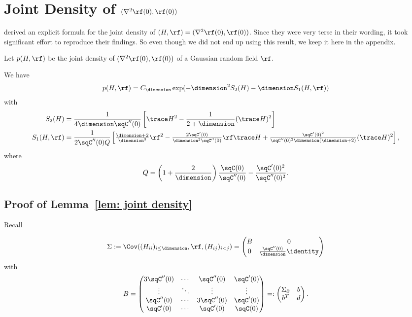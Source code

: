 \section{Joint Density of \texorpdfstring{\((\nabla^2\rf(0), \rf(0))\)}{(hessian ϕ(0), ϕ(0))}}

\textcite{brayStatisticsCriticalPoints2007} derived an explicit formula for the
joint density of \((H,\rf)=(\nabla^2\rf(0), \rf(0))\). Since they were very
terse in their wording, it took significant effort to reproduce their findings.
So even though we did not end up using this result, we keep it here in the
appendix.

Let \(p(H, \rf)\) be the joint density of \((\nabla^2\rf(0), \rf(0))\) of
a Gaussian random field \(\rf\).

\begin{lemma}\label{lem: joint density}
	We have
	\[
		p(H, \rf) = C_\dimension \exp(-\dimension^2 S_2(H) - \dimension S_1(H, \rf))
	\]
	with
	\begin{align*}
		S_2(H)
		&= \frac{1}{4\dimension\sqC''(0)}\left[
			\trace H^2 - \frac1{2+\dimension}(\trace H)^2
		\right]
		\\
		S_1(H,\rf)
		&= \frac1{2\sqC''(0)Q}\left[
			\tfrac{\dimension+2}{\dimension^3}\rf^2
			- \tfrac{2\sqC'(0)}{\dimension^2\sqC''(0)}\rf\trace H
			+ \tfrac{\sqC'(0)^2}{\sqC''(0)^2\dimension(\dimension+2)}(\trace H)^2
		\right],
	\end{align*}
	where
	\[
		Q = \left(1+\frac2\dimension\right)
		\frac{\sqC(0)}{\sqC''(0)} - \frac{\sqC'(0)^2}{\sqC''(0)^2}.
	\]
\end{lemma}

\subsection{Proof of Lemma~\ref{lem: joint density}}\label{subsec: joint density derivation}

Recall

\[
	\Sigma := \Cov((H_{ii})_{i\le\dimension}, \rf, (H_{ij})_{i<j})
	= \begin{pmatrix}
		B & 0\\
		0 & \frac{\sqC''(0)}{\dimension}\identity
	\end{pmatrix}
\]
with
\[
	B = \begin{pmatrix}
		3\sqC''(0) &  \cdots & \sqC''(0)
		& \sqC'(0) \\
		\vdots & \ddots &\vdots & \vdots \\
		\sqC''(0) & \cdots &  3 \sqC''(0) & \sqC'(0)\\
		\sqC'(0)	& \cdots & \sqC'(0) & \sqC(0)
	\end{pmatrix}
	=: \begin{pmatrix}
		\Sigma_\partial & b \\
		b^T & d
	\end{pmatrix}.
\]

